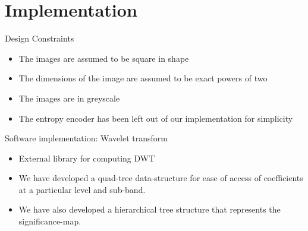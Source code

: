 \documentclass{beamer}
\begin{document}
\section{Implementation}
\begin{frame}{Design Constraints}
    \begin{itemize}
        \item The images are assumed to be square in shape
        \item The dimensions of the image are assumed to be exact powers of two
        \item The images are in greyscale
        \item The entropy encoder has been left out of our implementation for simplicity
    \end{itemize}
\end{frame}
\begin{frame}{Software implementation: Wavelet transform}
    \begin{itemize}
        \item External library for computing DWT \cite{rpwavelib}
        \item We have developed a quad-tree data-structure for ease of access
            of coefficients at a particular level and sub-band.
        \item We have also developed a hierarchical tree structure that
            represents the significance-map.
    \end{itemize}
\end{frame}
\end{document}
